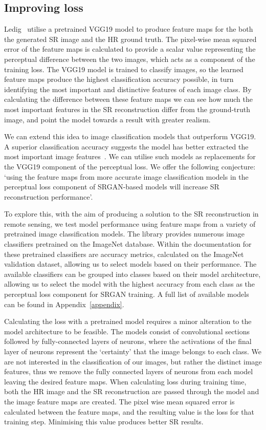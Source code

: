 \subsection{Improving loss}\label{subsec:improving_loss}
Ledig \etal \ utilise a pretrained VGG19 model to produce feature maps for the both the generated SR image and the HR ground truth. The pixel-wise mean squared error of the feature maps is calculated to provide a scalar value representing the perceptual difference between the two images, which acts as a component of the training loss. The VGG19 model is trained to classify images, so the learned feature maps produce the highest classification accuracy possible, in turn identifying the most important and distinctive features of each image class. By calculating the difference between these feature maps we can see how much the most important features in the SR reconstruction differ from the ground-truth image, and point the model towards a result with greater realism.

We can extend this idea to image classification models that outperform VGG19. A superior classification accuracy suggests the model has better extracted the most important image features~\cite{ref}. We can utilise such models as replacements for the VGG19 component of the perceptual loss. We offer the following conjecture: `using the feature maps from more accurate image classification models in the perceptual loss component of SRGAN-based models will increase SR reconstruction performance'.

To explore this, with the aim of producing a solution to the SR reconstruction in remote sensing, we  test model performance using feature maps from a variety of pretrained image classification models. The  library provides numerous image classifiers pretrained on the ImageNet database. Within the documentation for these pretrained classifiers are accuracy metrics, calculated on the ImageNet validation dataset, allowing us to select models based on their performance. The available classifiers can be grouped into classes based on their model architecture, allowing us to select the model with the highest accuracy from each class as the perceptual loss component for SRGAN training. A full list of available models can be found in Appendix~\ref{appendix}.

Calculating the loss with a pretrained model requires a minor alteration to the model architecture to be feasible. The models consist of convolutional sections followed by fully-connected layers of neurons, where the activations of the final layer of neurons represent the `certainty' that the image belongs to each class. We are not interested in the classification of our images, but rather the distinct image features, thus we remove the fully connected layers of neurons from each model leaving the desired feature maps. When calculating loss during training time, both the HR image and the SR reconstruction are passed through the model and the image feature maps are created. The pixel wise mean squared error is calculated between the feature maps, and the resulting value is the loss for that training step. Minimising this value produces better SR results.

